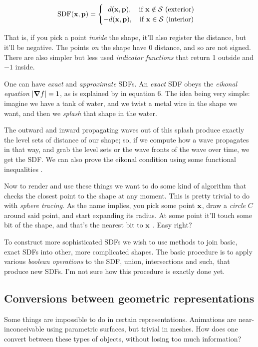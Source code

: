 \begin{align*}
\text{SDF}(\bf{x,p}) =
\begin{cases}
\ \ d(\bf{x,p}), \quad \text{if }\bf{x} \notin \mathcal{S} \ \text{(exterior)}
 \\
-d(\bf{x,p}), \quad \text{if }\bf{x} \in \mathcal{S} \ \text{(interior)}
\end{cases}
\end{align*}

That is, if you pick a point \emph{inside} the shape, it'll also
register the distance, but it'll be negative. The points \emph{on}
the shape have 0 distance, and so are not signed. There are also
simpler but less used \emph{indicator functions} that return 1 outside
and $-1$ inside.

\spa

One can have \emph{exact} and \emph{approximate} SDFs. An 
\emph{exact} SDF obeys the \emph{eikonal equation} $|\grad f| = 1$, as is
explained by \cite{wave1} in equation 6. The idea being very simple:
imagine we have a tank of water, and we twist a metal wire in the shape 
we want, and then we \emph{splash} that shape in the water.

\spa

The outward and inward propagating waves out of this splash produce
exactly the level sets of distance of our shape; so, if we compute how
a wave propagates in that way, and grab the level sets or the wave fronts
of the wave over time, we get the SDF. We can also prove the eikonal
condition using some functional inequalities \cite{wave2}.

\spa

Now to render and use these things we want to do some kind of algorithm
that checks the closest point to the shape at any moment. This is pretty
trivial to do with \emph{sphere tracing}. As the name implies, you pick
some point $\bf{x}$, draw a \emph{circle} $C$ around said point,
and start expanding its radius. At some point it'll touch some bit of
the shape, and that's the nearest bit to $\bf{x}$ \cite{SDF2}.
Easy right?

\spa

To construct more sophisticated SDFs we wish to use methods
to join basic, exact SDFs into other, more complicated shapes.
The basic procedure is to apply various \emph{boolean operations}
to the SDF, union, intersections and such, that produce new SDFs.
I'm not sure how this procedure is exactly done yet.

\subsection{Conversions between geometric representations}

Some things are impossible to do in certain representations. Animations
are near-inconceivable using parametric surfaces, but trivial in meshes.
How does one convert between these types of objects, without losing too
much information?
